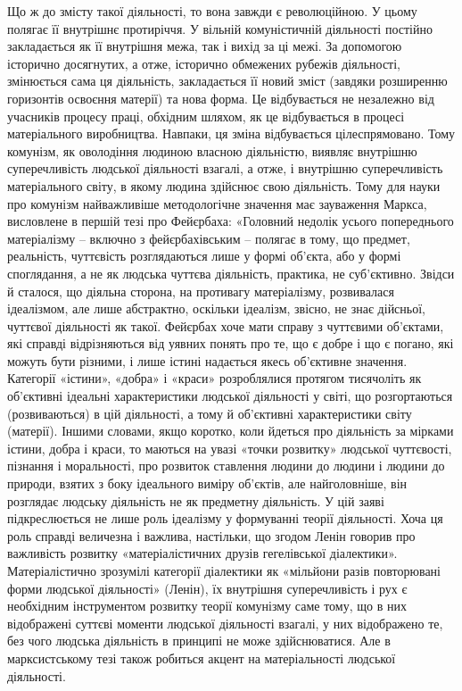 \documentclass[12pt,a4paper,openany]{book}
\begin{document}
Що ж до змісту такої діяльності, то вона завжди є революційною. У цьому полягає її внутрішнє протиріччя. У вільній комуністичній діяльності постійно закладається як її внутрішня межа, так і вихід за ці межі. За допомогою історично досягнутих, а отже, історично обмежених рубежів діяльності, змінюється сама ця діяльність, закладається її новий зміст (завдяки розширенню горизонтів освоєння матерії) та нова форма. Це відбувається не незалежно від учасників процесу праці, обхідним шляхом, як це відбувається в процесі матеріального виробництва. Навпаки, ця зміна відбувається цілеспрямовано. Тому комунізм, як оволодіння людиною власною діяльністю, виявляє внутрішню суперечливість людської діяльності взагалі, а отже, і внутрішню суперечливість матеріального світу, в якому людина здійснює свою діяльність. Тому для науки про комунізм найважливіше методологічне значення має зауваження Маркса, висловлене в першій тезі про Фейєрбаха: «Головний недолік усього попереднього матеріалізму – включно з фейєрбахівським – полягає в тому, що предмет, реальність, чуттєвість розглядаються лише у формі об’єкта, або у формі споглядання, а не як людська чуттєва діяльність, практика, не суб’єктивно. Звідси й сталося, що діяльна сторона, на противагу матеріалізму, розвивалася ідеалізмом, але лише абстрактно, оскільки ідеалізм, звісно, не знає дійсньої, чуттєвої діяльності як такої. Фейєрбах хоче мати справу з чуттєвими об’єктами, які справді відрізняються від уявних понять про те, що є добре і що є погано, які можуть бути різними, і лише істині надається якесь об’єктивне значення. Категорії «істини», «добра» і «краси» розроблялися протягом тисячоліть як об’єктивні ідеальні характеристики людської діяльності у світі, що розгортаються (розвиваються) в цій діяльності, а тому й об’єктивні характеристики світу (матерії). Іншими словами, якщо коротко, коли йдеться про діяльність за мірками істини, добра і краси, то маються на увазі «точки розвитку» людської чуттєвості, пізнання і моральності, про розвиток ставлення людини до людини і людини до природи, взятих з боку ідеального виміру об’єктів, але найголовніше, він розглядає людську діяльність не як предметну діяльність. У цій заяві підкреслюється не лише роль ідеалізму у формуванні теорії діяльності. Хоча ця роль справді величезна і важлива, настільки, що згодом Ленін говорив про важливість розвитку «матеріалістичних друзів гегелівської діалектики». Матеріалістично зрозумілі категорії діалектики як «мільйони разів повторювані форми людської діяльності» (Ленін), їх внутрішня суперечливість і рух є необхідним інструментом розвитку теорії комунізму саме тому, що в них відображені суттєві моменти людської діяльності взагалі, у них відображено те, без чого людська діяльність в принципі не може здійснюватися. Але в марксистському тезі також робиться акцент на матеріальності людської діяльності.
\end{document}
